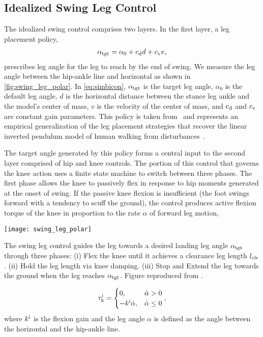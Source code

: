 \subsection{Idealized Swing Leg Control}\label{sec:neuro_ideal_swing}
The idealized swing control comprises two layers. In the first layer, a leg
placement policy,
\begin{align}
    \alpha_{\mathrm{tgt}} = \alpha_{0} + c_{\mathrm{d}} d + c_{\mathrm{v}} v,
    \label{eq:simbicon}
\end{align}
prescribes leg angle for the leg to reach by the end of swing. We measure the
leg angle between the hip-ankle line and horizontal as shown in
\cref{fig:swing_leg_polar}. In \cref{eq:simbicon}, $\alpha_{\mathrm{tgt}}$ is the
target leg angle, $\alpha_{0}$ is the default leg angle, $d$ is the horizontal
distance between the stance leg ankle and the model's center of mass, $v$ is the
velocity of the center of mass, and $c_{\mathrm{d}}$ and $c_{\mathrm{v}}$ are constant gain
parameters. This policy is taken from~\citet{yin2007simbicon} and represents an
empirical generalization of the leg placement strategies that recover the linear
inverted pendulum model of human walking from
disturbances~\citep{kajita20013d,pratt2006capture}. 

The target angle generated by this policy forms a central input to the second
layer comprised of hip and knee controls. The portion of this control that
governs the knee action uses a finite state machine to switch between three
phases. The first phase allows the knee to passively flex in response to hip
moments generated at the onset of swing. If the passive knee flexion is
insufficient (the foot swings forward with a tendency to scuff the ground), the
control produces active flexion torque of the knee in proportion to the rate
$\dot{\alpha}$ of forward leg motion,
\begin{marginfigure}
    \centering
    \texttt{[image: swing\_leg\_polar]}
    \caption{The swing leg control guides the leg towards a desired landing leg
    angle $\alpha_{\mathrm{tgt}}$ through three phases: (i) Flex the knee until it
    achieves a clearance leg length $l_{\mathrm{clr}}$. (ii) Hold the leg length via
    knee damping. (iii) Stop and Extend the leg towards the ground when the leg
    reaches $\alpha_{\mathrm{tgt}}$. Figure reproduced from \citet{desai2012robust}.}
    \label{fig:swing_leg_polar}
\end{marginfigure}
\begin{align}
    \tau_{\mathrm{k}}^{\mathrm{i}} = \begin{cases}
                 0,                     & \dot{\alpha} > 0 \\
                -k^{\mathrm{i}} \dot{\alpha}, & \dot{\alpha} \le 0 
                \end{cases},
    \label{eq:flexphase}
\end{align}
where $k^{\mathrm{i}}$ is the flexion gain and the leg angle $\alpha$ is defined as
the angle between the horizontal and the hip-ankle line.  

